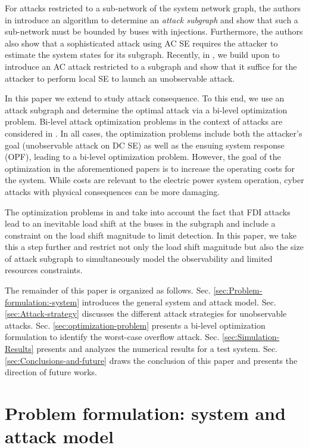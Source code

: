 \documentclass[twocolumn,english,final,journal]{IEEEtran}
\theoremstyle{plain}
\theoremstyle{definition}
\begin{document}
For attacks  restricted to a sub-network of the system network graph, the authors in  introduce an algorithm
to determine an \textit{attack subgraph} and show that such a sub-network
must be bounded by buses with injections. Furthermore, the authors
also show that a sophisticated attack using AC SE requires the attacker
to estimate the system states for its subgraph. Recently, in , we build upon  to introduce an AC attack restricted to a subgraph and show that it suffice for the attacker to perform local SE to launch an unobservable attack.

In this paper we extend  to study attack consequence. To this end, we use an attack subgraph
and determine the optimal attack via a bi-level optimization problem.
Bi-level attack optimization problems in the context of attacks are
considered in .
In all cases, the optimization problems include both the attacker's
goal (unobservable attack on DC SE) as well as the ensuing system
response (OPF), leading to a bi-level optimization problem. However, the goal of the optimization in the aforementioned
papers is to increase the operating costs for the system. While costs
are relevant to the electric power system operation, cyber attacks
with physical consequences can be more damaging.

The optimization problems in  and  take
into account the fact that FDI attacks lead to an inevitable load
shift at the buses in the subgraph and include a constraint on the load shift magnitude to limit detection. In this
paper, we take this a step further and restrict not only the load
shift magnitude but also the size of attack subgraph to simultaneously
model the observability and limited resources constraints.

The remainder of this paper is organized as follows. Sec. \ref{sec:Problem-formulation:-system}
introduces the general system and attack model. Sec. \ref{sec:Attack-strategy}
discusses the different attack strategies for unobservable attacks.
Sec. \ref{sec:optimization-problem} presents a bi-level optimization
formulation to identify the worst-case overflow attack. Sec. \ref{sec:Simulation-Results}
presents and analyzes the numerical results for a test system. Sec.
\ref{sec:Conclusions-and-future} draws the conclusion of this paper
and presents the direction of future works.

\section{Problem formulation: system and attack model\label{sec:Problem-formulation:-system}}
\end{document}
